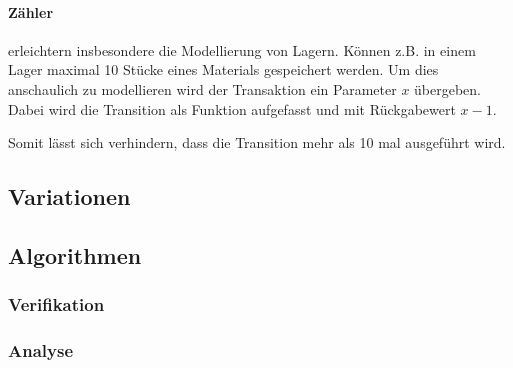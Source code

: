 \paragraph{Zähler} erleichtern insbesondere die Modellierung von Lagern.
Können z.B. in einem Lager maximal 10 Stücke eines Materials gespeichert werden.
Um dies anschaulich zu modellieren wird der Transaktion ein Parameter $x$ übergeben.
Dabei wird die Transition als Funktion aufgefasst und mit Rückgabewert $x - 1$.
\begin{center}
\end{center}
Somit lässt sich verhindern, dass die Transition mehr als 10 mal ausgeführt wird.


\subsection{Variationen}

\subsection{Algorithmen}

\subsubsection{Verifikation}

\subsubsection{Analyse}

